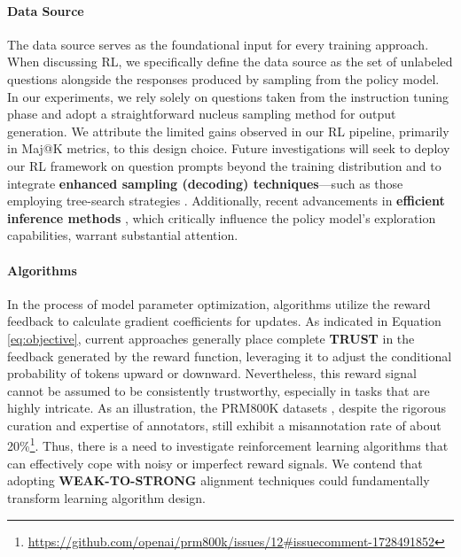 \begin{itemize}[topsep=0pt]
\begin{itemize}[topsep=0pt]
\paragraph{Data Source} The data source serves as the foundational input for every training approach. When discussing RL, we specifically define the data source as the set of unlabeled questions alongside the responses produced by sampling from the policy model. In our experiments, we rely solely on questions taken from the instruction tuning phase and adopt a straightforward nucleus sampling method for output generation. We attribute the limited gains observed in our RL pipeline, primarily in Maj@K metrics, to this design choice. Future investigations will seek to deploy our RL framework on question prompts beyond the training distribution and to integrate \textbf{enhanced sampling (decoding) techniques}—such as those employing tree-search strategies \citep{yao2023tree}. Additionally, recent advancements in \textbf{efficient inference methods} \citep{xia-etal-2023-speculative,leviathan2023fast,kwon2023efficient,xia2024unlocking}, which critically influence the policy model's exploration capabilities, warrant substantial attention.

\paragraph{Algorithms} In the process of model parameter optimization, algorithms utilize the reward feedback to calculate gradient coefficients for updates. As indicated in Equation \ref{eq:objective}, current approaches generally place complete \textbf{TRUST} in the feedback generated by the reward function, leveraging it to adjust the conditional probability of tokens upward or downward. Nevertheless, this reward signal cannot be assumed to be consistently trustworthy, especially in tasks that are highly intricate. As an illustration, the PRM800K datasets \citep{lightman2023let}, despite the rigorous curation and expertise of annotators, still exhibit a misannotation rate of about 20\%\footnote{\url{https://github.com/openai/prm800k/issues/12\#issuecomment-1728491852}}. Thus, there is a need to investigate reinforcement learning algorithms that can effectively cope with noisy or imperfect reward signals. We contend that adopting \textbf{WEAK-TO-STRONG} alignment techniques \citep{burns2023weak} could fundamentally transform learning algorithm design.


\end{itemize}
\end{itemize}
